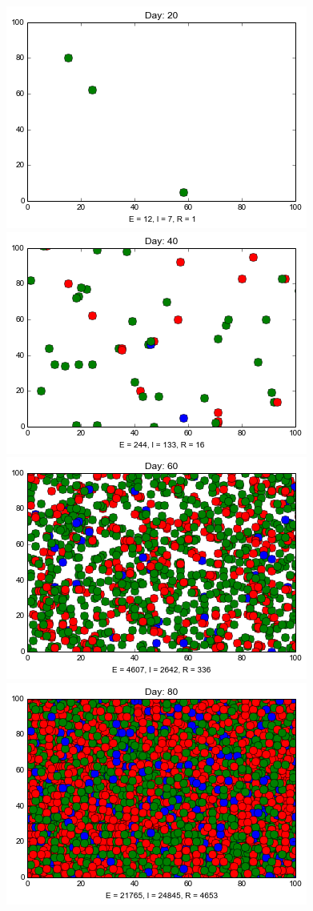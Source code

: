 \begin{figure}
\medskip
\includegraphics[scale=0.25]{images/5t20.png} \quad
\includegraphics[scale=0.25]{images/5t40.png} \quad
\includegraphics[scale=0.25]{images/5t60.png} \quad
\includegraphics[scale=0.25]{images/5t80.png} 
\end{figure}
